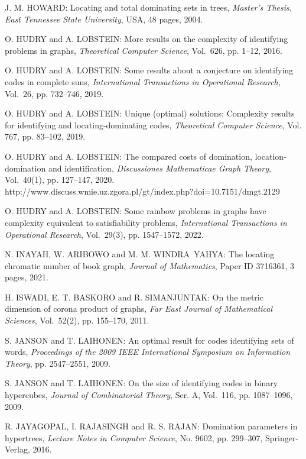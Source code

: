\begin{thebibliography}{999}
J. M. HOWARD: Locating and total dominating sets in trees, {\it Master's Thesis, East Tennessee State University}, USA, 48 pages, 2004.

O. HUDRY and A. LOBSTEIN: More results on the complexity of identifying problems in graphs, {\it Theoretical Computer Science}, Vol.~626, pp. 1--12, 2016.

O. HUDRY and A. LOBSTEIN: Some results about a conjecture on identifying codes in complete suns, {\it International Transactions in Operational Research}, Vol.~26, pp. 732--746, 2019.

O. HUDRY and A. LOBSTEIN: Unique (optimal) solutions: Complexity results for identifying and locating-dominating codes, {\it Theoretical Computer Science}, Vol. 767, pp. 83--102, 2019.

O. HUDRY and A. LOBSTEIN: The compared costs of domination, location-domination and identification, {\it Discussiones Mathematicae Graph Theory}, Vol.~40(1), pp. 127--147, 2020.\\
http://www.discuss.wmie.uz.zgora.pl/gt/index.php?doi=10.7151/dmgt.2129

O. HUDRY and A. LOBSTEIN: Some rainbow problems in graphs have complexity equivalent to satisfiability problems, {\it International Transactions in Operational Research}, Vol.~29(3), pp. 1547--1572, 2022.

N. INAYAH, W. ARIBOWO and M. M. WINDRA~YAHYA: The locating chromatic number of book graph, {\it Journal of Mathematics}, Paper ID 3716361, 3 pages, 2021.

H. ISWADI, E. T. BASKORO and R. SIMANJUNTAK: On the metric dimension of corona product of graphs, {\it Far East Journal of Mathematical Sciences}, Vol.~52(2), pp. 155--170, 2011.

S. JANSON and T. LAIHONEN: An optimal result for codes identifying sets of words, {\it Proceedings of the 2009 IEEE International Symposium on Information Theory}, pp. 2547--2551, 2009.

S. JANSON and T. LAIHONEN: On the size of identifying codes in binary hypercubes, {\it Journal of Combinatorial Theory}, Ser. A, Vol.~116, pp. 1087--1096, 2009.

R. JAYAGOPAL, I. RAJASINGH and R. S. RAJAN: Domination parameters in hypertrees, {\it Lecture Notes in Computer Science}, No. 9602, pp. 299--307, Springer-Verlag, 2016.


\end{thebibliography}
